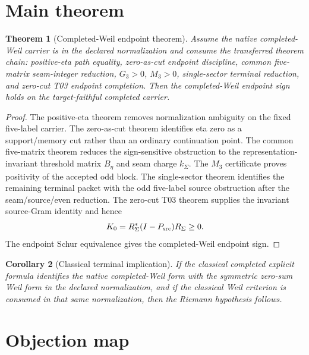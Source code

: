 \documentclass[11pt]{article}
\newtheorem{theorem}{Theorem}[section]
\newtheorem{corollary}[theorem]{Corollary}
\newcommand{\Psrc}{P_{\rm src}}
\newcommand{\RSigma}{R_\Sigma}
\newcommand{\BSEta}{B_\eta}
\newcommand{\kSigma}{k_\Sigma}
\begin{document}
\section{Main theorem}

\begin{theorem}[Completed-Weil endpoint theorem]
Assume the native completed-Weil carrier is in the declared normalization and consume the transferred theorem chain: positive-eta path equality, zero-as-cut endpoint discipline, common five-matrix seam-integer reduction, \(G_3>0\), \(M_3>0\), single-sector terminal reduction, and zero-cut T03 endpoint completion.  Then the completed-Weil endpoint sign holds on the target-faithful completed carrier.
\end{theorem}

\begin{proof}
The positive-eta theorem removes normalization ambiguity on the fixed five-label carrier.  The zero-as-cut theorem identifies eta zero as a support/memory cut rather than an ordinary continuation point.  The common five-matrix theorem reduces the sign-sensitive obstruction to the representation-invariant threshold matrix \(\BSEta\) and seam charge \(\kSigma\).  The \(M_3\) certificate proves positivity of the accepted odd block.  The single-sector theorem identifies the remaining terminal packet with the odd five-label source obstruction after the seam/source/even reduction.  The zero-cut T03 theorem supplies the invariant source-Gram identity and hence
\[
K_0=\RSigma^*(I-\Psrc)\RSigma\ge0.
\]
The endpoint Schur equivalence gives the completed-Weil endpoint sign.
\end{proof}

\begin{corollary}[Classical terminal implication]
If the classical completed explicit formula identifies the native completed-Weil form with the symmetric zero-sum Weil form in the declared normalization, and if the classical Weil criterion is consumed in that same normalization, then the Riemann hypothesis follows.
\end{corollary}

\section{Objection map}
\end{document}
